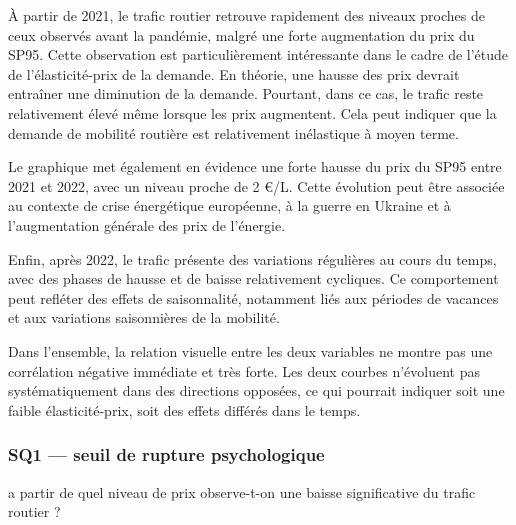 \documentclass[
]{article}
\begin{document}
À partir de 2021, le trafic routier retrouve rapidement des niveaux
proches de ceux observés avant la pandémie, malgré une forte
augmentation du prix du SP95. Cette observation est particulièrement
intéressante dans le cadre de l'étude de l'élasticité-prix de la
demande. En théorie, une hausse des prix devrait entraîner une
diminution de la demande. Pourtant, dans ce cas, le trafic reste
relativement élevé même lorsque les prix augmentent. Cela peut indiquer
que la demande de mobilité routière est relativement inélastique à moyen
terme.

Le graphique met également en évidence une forte hausse du prix du SP95
entre 2021 et 2022, avec un niveau proche de 2 €/L. Cette évolution peut
être associée au contexte de crise énergétique européenne, à la guerre
en Ukraine et à l'augmentation générale des prix de l'énergie.

Enfin, après 2022, le trafic présente des variations régulières au cours
du temps, avec des phases de hausse et de baisse relativement cycliques.
Ce comportement peut refléter des effets de saisonnalité, notamment liés
aux périodes de vacances et aux variations saisonnières de la mobilité.

Dans l'ensemble, la relation visuelle entre les deux variables ne montre
pas une corrélation négative immédiate et très forte. Les deux courbes
n'évoluent pas systématiquement dans des directions opposées, ce qui
pourrait indiquer soit une faible élasticité-prix, soit des effets
différés dans le temps.

\subsubsection{SQ1 --- seuil de rupture
psychologique}\label{sq1-seuil-de-rupture-psychologique}

a partir de quel niveau de prix observe-t-on une baisse significative du
trafic routier ?
\end{document}
